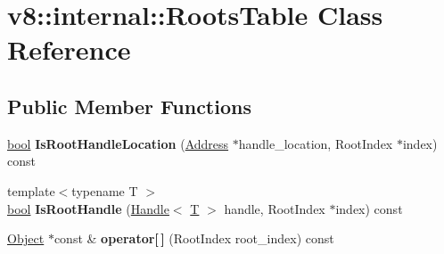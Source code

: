 \hypertarget{classv8_1_1internal_1_1RootsTable}{}\section{v8\+:\+:internal\+:\+:Roots\+Table Class Reference}
\label{classv8_1_1internal_1_1RootsTable}
\subsection*{Public Member Functions}
\begin{DoxyCompactItemize}
\item 
\mbox{\label{classv8_1_1internal_1_1RootsTable_a55978a96c28ab4bcff3923e192a2ae30}} 
\mbox{\hyperlink{classbool}{bool}} {\bfseries Is\+Root\+Handle\+Location} (\mbox{\hyperlink{classuintptr__t}{Address}} $\ast$handle\+\_\+location, Root\+Index $\ast$index) const
\item 
\mbox{\label{classv8_1_1internal_1_1RootsTable_a2ab3af6b088413dc185c13c496cd7282}} 
{\footnotesize template$<$typename T $>$ }\\\mbox{\hyperlink{classbool}{bool}} {\bfseries Is\+Root\+Handle} (\mbox{\hyperlink{classv8_1_1internal_1_1Handle}{Handle}}$<$ \mbox{\hyperlink{classv8_1_1internal_1_1torque_1_1T}{T}} $>$ handle, Root\+Index $\ast$index) const
\item 
\mbox{\label{classv8_1_1internal_1_1RootsTable_a522b2e52478b6078cf14ce218f61e751}} 
\mbox{\hyperlink{classv8_1_1internal_1_1Object}{Object}} $\ast$const  \& {\bfseries operator\mbox{[}$\,$\mbox{]}} (Root\+Index root\+\_\+index) const
\end{DoxyCompactItemize}
